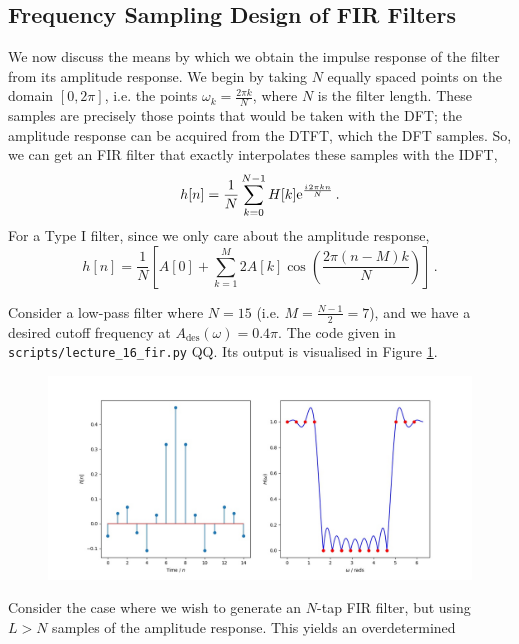\subsection{Frequency Sampling Design of FIR Filters}
%
We now discuss the means by which we obtain the impulse response of the filter
from its amplitude response. We begin by taking $N$ equally spaced points on
the domain $[0,2\pi]$, i.e. the points $\omega_k = \frac{2\pi k}{N}$, where $N$
is the filter length. These samples are precisely those points that would be
taken with the DFT; the amplitude response can be acquired from the DTFT, which
the DFT samples. So, we can get an FIR filter that exactly interpolates these
samples with the IDFT,
%
\begin{displaymath}
  h[n] = \frac{1}{N}\sum_{k=0}^{N-1}H[k]\mathrm{e}^{\frac{{i\mkern1mu} 2\pi k n}{N}} \,.
\end{displaymath}
%
For a Type I filter, since we only care about the amplitude response,
%
\begin{displaymath}
  h[n] = \frac{1}{N}\left[
    A[0] + \sum_{k=1}^M 2A[k]\cos\left(\frac{2\pi(n-M)k}{N}\right)
  \right] \,.
\end{displaymath}
%
\begin{exmp}
  Consider a low-pass filter where $N=15$ (i.e. $M = \frac{N-1}{2} = 7$), and we
  have a desired cutoff frequency at $A_\mathrm{des}(\omega) = 0.4\pi$. The
  code given in \texttt{scripts/lecture\_16\_fir.py} QQ. Its output is visualised
  in Figure \ref{fig::lecture_16_fir}.
  \begin{figure}[!htb]
    \includegraphics[width=\textwidth]{images/lecture_16_fir.JPG}
    \caption{
    }
    \label{fig::lecture_16_fir}
  \end{figure}
\end{exmp}
%
Consider the case where we wish to generate an $N$-tap FIR filter, but
using $L>N$ samples of the amplitude response. This yields an overdetermined

